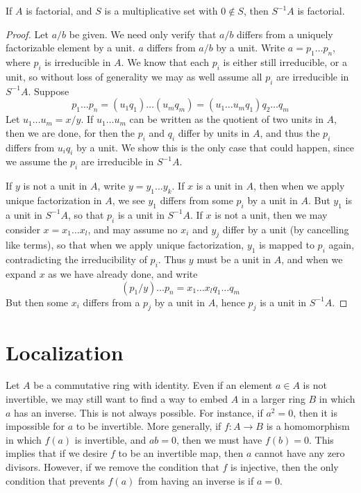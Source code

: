 \begin{theorem}
    If $A$ is factorial, and $S$ is a multiplicative set with $0 \not \in S$, then $S^{-1}A$ is factorial.
\end{theorem}
\begin{proof}
    Let $a/b$ be given. We need only verify that $a/b$ differs from a uniquely factorizable element by a unit. $a$ differs from $a/b$ by a unit. Write $a = p_1 \dots p_n$, where $p_i$ is irreducible in $A$. We know that each $p_i$ is either still irreducible, or a unit, so without loss of generality we may as well assume all $p_i$ are irreducible in $S^{-1}A$. Suppose
    \[ p_1 \dots p_n = (u_1 q_1) \dots (u_m q_m) = (u_1 \dots u_m q_1) q_2 \dots q_m \]
    Let $u_1 \dots u_m = x/y$. If $u_1 \dots u_m$ can be written as the quotient of two units in $A$, then we are done, for then the $p_i$ and $q_i$ differ by units in $A$, and thus the $p_i$ differs from $u_i q_i$ by a unit. We show this is the only case that could happen, since we assume the $p_i$ are irreducible in $S^{-1}A$.

    If $y$ is not a unit in $A$, write $y = y_1 \dots y_k$. If $x$ is a unit in $A$, then when we apply unique factorization in $A$, we see $y_1$ differs from some $p_i$ by a unit in $A$. But $y_1$ is a unit in $S^{-1}A$, so that $p_i$ is a unit in $S^{-1}A$. If $x$ is not a unit, then we may consider $x = x_1 \dots x_{l}$, and may assume no $x_i$ and $y_j$ differ by a unit (by cancelling like terms), so that when we apply unique factorization, $y_1$ is mapped to $p_i$ again, contradicting the irreducibility of $p_i$. Thus $y$ must be a unit in $A$, and when we expand $x$ as we have already done, and write
    \[ (p_1/y) \dots p_n = x_1 \dots x_{l} q_1 \dots q_m \]
    But then some $x_i$ differs from a $p_j$ by a unit in $A$, hence $p_j$ is a unit in $S^{-1}A$.
\end{proof}

\section{Localization}

Let $A$ be a commutative ring with identity. Even if an element $a \in A$ is not invertible, we may still want to find a way to embed $A$ in a larger ring $B$ in which $a$ has an inverse. This is not always possible. For instance, if $a^2 = 0$, then it is impossible for $a$ to be invertible. More generally, if $f: A \to B$ is a homomorphism in which $f(a)$ is invertible, and $ab = 0$, then we must have $f(b) = 0$. This implies that if we desire $f$ to be an invertible map, then $a$ cannot have any zero divisors. However, if we remove the condition that $f$ is injective, then the only condition that prevents $f(a)$ from having an inverse is if $a = 0$.

